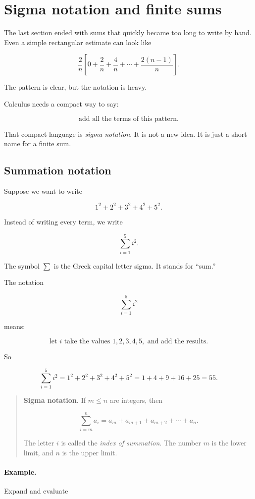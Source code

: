 \section{Sigma notation and finite sums}
\label{sec:sigma-notation-finite-sums}

The last section ended with sums that quickly became too long to write by hand.  Even
a simple rectangular estimate can look like

\[
\frac{2}{n}
\left[
0+\frac{2}{n}+\frac{4}{n}+\cdots+\frac{2(n-1)}{n}
\right].
\]

The pattern is clear, but the notation is heavy.

Calculus needs a compact way to say:

\[
\text{add all the terms of this pattern.}
\]

That compact language is \emph{sigma notation}.  It is not a new idea.  It is just a
short name for a finite sum.

\subsection{Summation notation}
\label{subsec:summation-notation}

Suppose we want to write

\[
1^2+2^2+3^2+4^2+5^2.
\]

Instead of writing every term, we write

\[
\sum_{i=1}^{5} i^2.
\]

The symbol \(\sum\) is the Greek capital letter sigma.  It stands for ``sum.''

The notation

\[
\sum_{i=1}^{5} i^2
\]

means:

\[
\text{let \(i\) take the values }1,2,3,4,5,\text{ and add the results.}
\]

So

\[
\sum_{i=1}^{5} i^2
=
1^2+2^2+3^2+4^2+5^2
=
1+4+9+16+25
=
55.
\]

\begin{quote}
\textbf{Sigma notation.}
If \(m\le n\) are integers, then

\[
\boxed{
\sum_{i=m}^{n} a_i
=
a_m+a_{m+1}+a_{m+2}+\cdots+a_n.
}
\]

The letter \(i\) is called the \emph{index of summation}.  The number \(m\) is the
lower limit, and \(n\) is the upper limit.
\end{quote}

\paragraph{Example.}
Expand and evaluate

